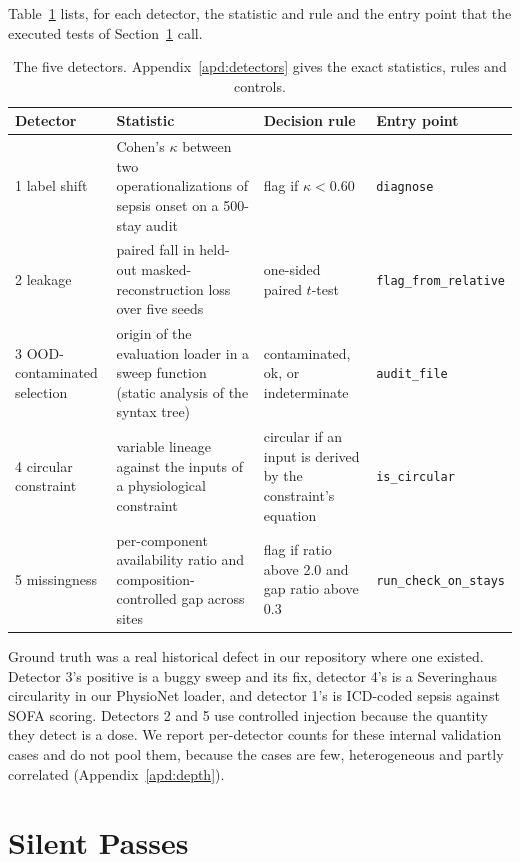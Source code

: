 \documentclass[10pt]{article}
\theoremstyle{definition}
\begin{document}
Table~\ref{tab:detectors} lists, for each detector, the statistic and rule and the entry point that the executed tests of Section~\ref{sec:silent} call.

\begin{table}[t]
\centering\footnotesize\setlength{\tabcolsep}{3pt}
\begin{tabular}{@{}p{2.5cm}p{4.3cm}p{3.1cm}p{3.2cm}@{}}
\toprule
Detector & Statistic & Decision rule & Entry point\\
\midrule
1 label shift & Cohen's $\kappa$ between two operationalizations of sepsis onset on a 500-stay audit & flag if $\kappa<0.60$ & \texttt{diagnose}\\
2 leakage & paired fall in held-out masked-reconstruction loss over five seeds & one-sided paired $t$-test & \texttt{flag\_from\_relative}\\
3 OOD-contaminated selection & origin of the evaluation loader in a sweep function (static analysis of the syntax tree) & contaminated, ok, or indeterminate & \texttt{audit\_file}\\
4 circular constraint & variable lineage against the inputs of a physiological constraint & circular if an input is derived by the constraint's equation & \texttt{is\_circular}\\
5 missingness & per-component availability ratio and composition-controlled gap across sites & flag if ratio above 2.0 and gap ratio above 0.3 & \texttt{run\_check\_on\_stays}\\
\bottomrule
\end{tabular}
\caption{The five detectors. Appendix~\ref{apd:detectors} gives the exact statistics, rules and controls.}
\label{tab:detectors}
\end{table}

Ground truth was a real historical defect in our repository where one existed. Detector 3's positive is a buggy sweep and its fix, detector 4's is a Severinghaus circularity in our PhysioNet loader, and detector 1's is ICD-coded sepsis against SOFA scoring. Detectors 2 and 5 use controlled injection because the quantity they detect is a dose. We report per-detector counts for these internal validation cases and do not pool them, because the cases are few, heterogeneous and partly correlated (Appendix~\ref{apd:depth}).

\section{Silent Passes}
\label{sec:silent}
\label{sec:results}
\end{document}
